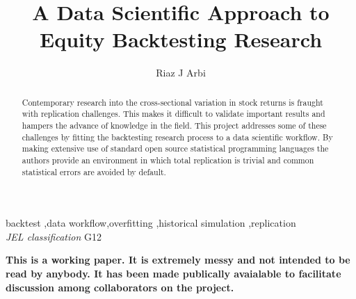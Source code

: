 \documentclass[11pt,preprint, authoryear]{elsarticle}
\numberwithin{equation}{section}
\numberwithin{figure}{section}
\numberwithin{table}{section}
\begin{document}
\begin{frontmatter}  %

\title{A Data Scientific Approach to Equity Backtesting Research}

\author[Add1]{Riaz J Arbi}





\address[Add1]{University of Cape Town, Cape Town, South Africa}


\begin{abstract}
\small{
Contemporary research into the cross-sectional variation in stock
returns is fraught with replication challenges. This makes it difficult
to validate important results and hampers the advance of knowledge in
the field. This project addresses some of these challenges by fitting
the backtesting research process to a data scientific workflow. By
making extensive use of standard open source statistical programming
languages the authors provide an environment in which total replication
is trivial and common statistical errors are avoided by default.
}
\end{abstract}

\vspace{1cm}

\begin{keyword}
\footnotesize{
backtest \sep data workflow\sep overfitting \sep historical simulation
\sep replication \\ \vspace{0.3cm}
\textit{JEL classification} G12
}
\end{keyword}
\vspace{0.5cm}
\end{frontmatter}



\pagestyle{fancy}
\chead{}
\rhead{}
\lfoot{}
\lhead{}
\cfoot{}


\headsep 35pt %




\textbf{This is a working paper. It is extremely messy and not intended
to be read by anybody. It has been made publically avaialable to
facilitate discussion among collaborators on the project.}
\end{document}
